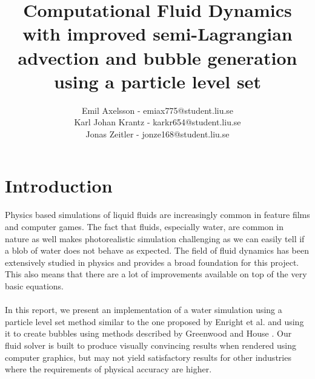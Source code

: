 \documentclass[twocolumn]{article}
\begin{document}
\title{Computational Fluid Dynamics with improved semi-Lagrangian advection and bubble generation using a particle level set}
\author{
    Emil Axelsson - emiax775@student.liu.se\\
    Karl Johan Krantz - karkr654@student.liu.se\\
    Jonas Zeitler - jonze168@student.liu.se
}

\clearpage
\twocolumn[
\begin{@twocolumnfalse}
\tableofcontents
\end{@twocolumnfalse}
]

\clearpage
{}
\section{Introduction}
Physics based simulations of liquid fluids are increasingly common in feature films and computer games. The fact that fluids, especially water, are common in nature as well makes photorealistic simulation challenging as we can easily tell if a blob of water does not behave as expected. The field of fluid dynamics has been extensively studied in physics and provides a broad foundation for this project. This also means that there are a lot of improvements available on top of the very basic equations. 
\\\\
In this report, we present an implementation of a water simulation using a particle level set method similar to the one proposed by Enright et al. \cite{particleLevelSet} and using it to create bubbles using methods described by Greenwood and House \cite{betterWithBubbles}. Our fluid solver is built to produce visually convincing results when rendered using computer graphics, but may not yield satisfactory results for other industries where the requirements of physical accuracy are higher.
\end{document}
